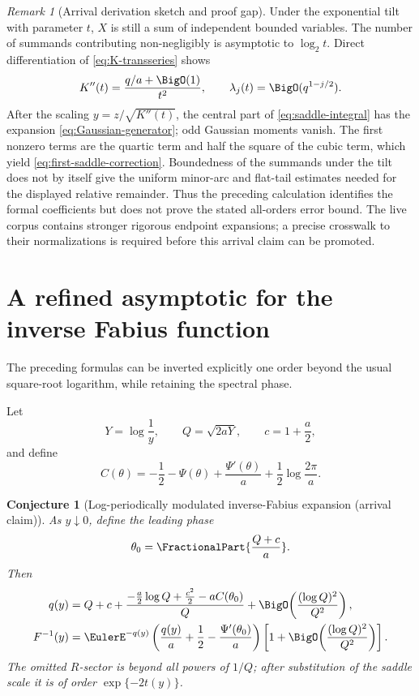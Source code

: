 \documentclass[11pt,oneside]{article}
\newtheorem{conjecture}[theorem]{Conjecture}
\theoremstyle{definition}
\theoremstyle{remark}
\newtheorem{remark}[theorem]{Remark}
\begin{document}
\begin{remark}[Arrival derivation sketch and proof gap]
Under the exponential tilt with parameter \(t\), \(X\) is still a sum of
independent bounded variables.  The number of summands contributing
non-negligibly is asymptotic to \(\log_2t\).  Direct differentiation of
\eqref{eq:K-transseries} shows
\[
 K''(t)=\frac{q/a+\BigO(1)}{t^2},\qquad
 \lambda_j(t)=\BigO(q^{1-j/2}).
\]
After the scaling \(y=z/\sqrt{K''(t)}\), the central part of
\eqref{eq:saddle-integral} has the expansion
\eqref{eq:Gaussian-generator}; odd Gaussian moments vanish.  The first
nonzero terms are the quartic term and half the square of the cubic term,
which yield \eqref{eq:first-saddle-correction}.  Boundedness of the summands
under the tilt does not by itself give the uniform minor-arc and flat-tail
estimates needed for the displayed relative remainder.  Thus the preceding
calculation identifies the formal coefficients but does not prove the stated
all-orders error bound.  The live corpus contains stronger rigorous endpoint
expansions; a precise crosswalk to their normalizations is required before
this arrival claim can be promoted.
\end{remark}

\section{A refined asymptotic for the inverse Fabius function}

The preceding formulas can be inverted explicitly one order beyond the usual
square-root logarithm, while retaining the spectral phase.

Let
\[
 Y=\log\frac1y,\qquad
 Q=\sqrt{2aY},\qquad
 c=1+\frac a2,
\]
and define
\begin{equation}
 C(\theta)
 =-\frac12-\Psi(\theta)
   +\frac{\Psi'(\theta)}a
   +\frac12\log\frac{2\pi}{a}.
 \label{eq:Ctheta}
\end{equation}

\begin{conjecture}[Log-periodically modulated inverse-Fabius expansion (arrival claim)]
\label{thm:inverse-Fabius}
As \(y\downarrow0\), define the leading phase
\[
 \theta_0=
 \FractionalPart{\frac{Q+c}{a}}.
\]
Then
\begin{align}
 q(y)
 ={}&
 Q+c+
 \frac{
  -\frac a2\log Q+\frac{c^2}{2}-aC(\theta_0)
 }{Q}
 +\BigO\!\left(\frac{(\log Q)^2}{Q^2}\right),
 \label{eq:q-inverse}\\
 F^{-1}(y)
 ={}&
 \EulerE^{-q(y)}
 \left(
  \frac{q(y)}a+\frac12
  -\frac{\Psi'(\theta_0)}a
 \right)
 \left[
  1+\BigO\!\left(\frac{(\log Q)^2}{Q^2}\right)
 \right].
 \label{eq:F-inverse}
\end{align}
The omitted \(R\)-sector is beyond all powers of \(1/Q\); after substitution
of the saddle scale it is of order
\(\exp\{-2t(y)\}\).
\end{conjecture}
\end{document}
